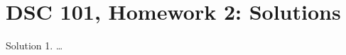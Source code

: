 \documentclass{article}
\begin{document}
\section*{DSC 101, Homework 2: Solutions}
Solution 1. \dots
\end{document}
